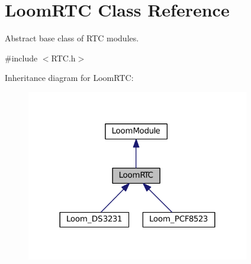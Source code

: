 \hypertarget{class_loom_r_t_c}{}\section{Loom\+R\+TC Class Reference}
\label{class_loom_r_t_c}


Abstract base class of R\+TC modules.  




{\ttfamily \#include $<$R\+T\+C.\+h$>$}



Inheritance diagram for Loom\+R\+TC\+:\nopagebreak
\begin{figure}[H]
\begin{center}
\leavevmode
\includegraphics[width=276pt]{class_loom_r_t_c__inherit__graph}
\end{center}
\end{figure}
